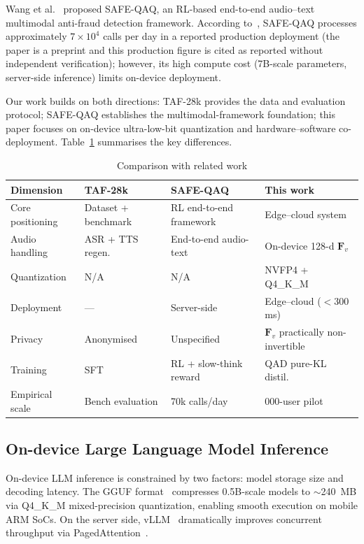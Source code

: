 \documentclass[final,5p,times,number]{elsarticle}
\begin{document}
Wang et al.~\cite{2} proposed SAFE-QAQ, an RL-based end-to-end audio--text multimodal anti-fraud detection framework. According to~\cite{2}, SAFE-QAQ processes approximately $7\times10^4$ calls per day in a reported production deployment (the paper is a preprint and this production figure is cited as reported without independent verification); however, its high compute cost (7B-scale parameters, server-side inference) limits on-device deployment.

Our work builds on both directions: TAF-28k provides the data and evaluation protocol; SAFE-QAQ establishes the multimodal-framework foundation; this paper focuses on on-device ultra-low-bit quantization and hardware--software co-deployment. Table~\ref{tab1} summarises the key differences.

\begin{table}[!t]
\centering\small
\caption{Comparison with related work}
\label{tab1}
\renewcommand{\arraystretch}{1.15}
\setlength{\tabcolsep}{4pt}
\begin{tabular}{>{\raggedright\arraybackslash}p{3.5cm}>{\raggedright\arraybackslash}p{3.5cm}>{\raggedright\arraybackslash}p{5.2cm}>{\raggedright\arraybackslash}p{4.5cm}}
\toprule
\textbf{Dimension} & \textbf{TAF-28k~\cite{1}} & \textbf{SAFE-QAQ~\cite{2}} & \textbf{This work} \\
\midrule
Core positioning & Dataset + benchmark & RL end-to-end framework & Edge--cloud system \\
Audio handling & ASR + TTS regen. & End-to-end audio-text & On-device 128-d $\bm{F}_v$ \\
Quantization & N/A & N/A & NVFP4 + Q4\_K\_M \\
Deployment & --- & Server-side & Edge--cloud ($<$300 ms) \\
Privacy & Anonymised & Unspecified & $\bm{F}_v$ practically non-invertible \\
Training & SFT & RL + slow-think reward & QAD pure-KL distil. \\
Empirical scale & Bench evaluation & 70k calls/day & 2{,}000-user pilot\\
\bottomrule
\end{tabular}
\end{table}

\subsection{On-device Large Language Model Inference}

On-device LLM inference is constrained by two factors: model storage size and decoding latency. The GGUF format~\cite{17} compresses 0.5B-scale models to $\sim$240~MB via Q4\_K\_M mixed-precision quantization, enabling smooth execution on mobile ARM SoCs. On the server side, vLLM~\cite{18} dramatically improves concurrent throughput via PagedAttention~\cite{19}.
\end{document}
